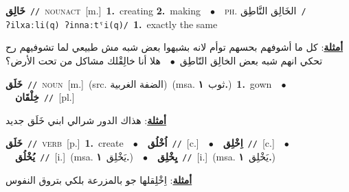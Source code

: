 \documentclass[10pt,a4paper,twoside]{article} %
\begin{document}
\begin{multicols}{2}
{\setlength\topsep{0pt}\textbf{\foreignlanguage{arabic}{خَالِق}}\ {\color{gray}\texttt{//}\color{black}}\ \textsc{noun\textunderscore act}\ [m.]\ \textbf{1.}~creating  \textbf{2.}~making\ \ $\bullet$\ \ \textsc{ph.} \color{gray} \foreignlanguage{arabic}{الخَالِق النَّاطِق}\color{black}\ {\color{gray}\texttt{/{\sffamily ʔilxaːli(q) ʔinnaːtˤi(q)}/}\color{black}}\ \textbf{1.}~exactly the same\  \begin{flushright}\color{gray}\foreignlanguage{arabic}{\textbf{\underline{\foreignlanguage{arabic}{أمثلة}}}: كل ما أشوفهم بحسهم توأم لانه بشبهوا بعض شبه مش طبيعي لما تشوفيهم رح تحكي انهم شبه بعض الخالِق النّاطِق\ $\bullet$\ \  هلا أنا خالِقْلك مشاكل من تحت الأرض؟}\end{flushright}\color{black}} \vspace{2mm}

{\setlength\topsep{0pt}\textbf{\foreignlanguage{arabic}{خَلَق}}\ {\color{gray}\texttt{//}\color{black}}\ \textsc{noun}\ [m.]\ (src. \color{gray}\foreignlanguage{arabic}{الضفة الغربية}\color{black})\ \color{gray}(msa. \foreignlanguage{arabic}{ثوب}~\foreignlanguage{arabic}{\textbf{١.}})\color{black}\ \textbf{1.}~gown\ \ $\bullet$\ \ \setlength\topsep{0pt}\textbf{\foreignlanguage{arabic}{خِلْقَان}}\ {\color{gray}\texttt{//}\color{black}}\ [pl.]\  \begin{flushright}\color{gray}\foreignlanguage{arabic}{\textbf{\underline{\foreignlanguage{arabic}{أمثلة}}}: هذاك الدور شرالي ابني خَلَق جديد}\end{flushright}\color{black}} \vspace{2mm}

{\setlength\topsep{0pt}\textbf{\foreignlanguage{arabic}{خَلَق}}\ {\color{gray}\texttt{//}\color{black}}\ \textsc{verb}\ [p.]\ \textbf{1.}~create\ \ $\bullet$\ \ \setlength\topsep{0pt}\textbf{\foreignlanguage{arabic}{اُخْلُق}}\ {\color{gray}\texttt{//}\color{black}}\ [c.]\ \ $\bullet$\ \ \setlength\topsep{0pt}\textbf{\foreignlanguage{arabic}{اِخْلِق}}\ {\color{gray}\texttt{//}\color{black}}\ [c.]\ \ $\bullet$\ \ \setlength\topsep{0pt}\textbf{\foreignlanguage{arabic}{يُخْلُق}}\ {\color{gray}\texttt{//}\color{black}}\ [i.]\ \color{gray}(msa. \foreignlanguage{arabic}{يَخْلِق}~\foreignlanguage{arabic}{\textbf{١.}})\color{black}\ \ $\bullet$\ \ \setlength\topsep{0pt}\textbf{\foreignlanguage{arabic}{يِخْلِق}}\ {\color{gray}\texttt{//}\color{black}}\ [i.]\ \color{gray}(msa. \foreignlanguage{arabic}{يَخْلِق}~\foreignlanguage{arabic}{\textbf{١.}})\color{black}\  \begin{flushright}\color{gray}\foreignlanguage{arabic}{\textbf{\underline{\foreignlanguage{arabic}{أمثلة}}}: اِخْلِقلها جو بالمزرعة بلكي بتروق النفوس}\end{flushright}\color{black}} \vspace{2mm}


\end{multicols}
\end{document}
